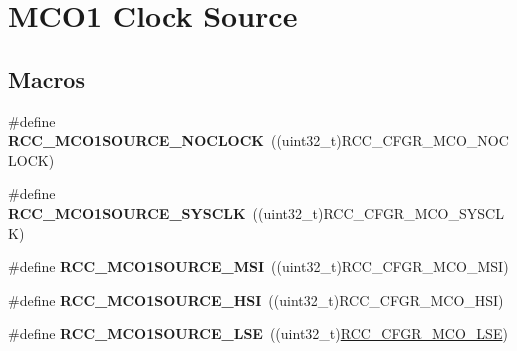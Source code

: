 \hypertarget{group___r_c_c___m_c_o1___clock___source}{\section{M\-C\-O1 Clock Source}
\label{group___r_c_c___m_c_o1___clock___source}
}
\subsection*{Macros}
\begin{DoxyCompactItemize}
\item 
\hypertarget{group___r_c_c___m_c_o1___clock___source_ga725a16362f3324ef5866dc5a1ff07cf5}{\#define {\bfseries R\-C\-C\-\_\-\-M\-C\-O1\-S\-O\-U\-R\-C\-E\-\_\-\-N\-O\-C\-L\-O\-C\-K}~((uint32\-\_\-t)R\-C\-C\-\_\-\-C\-F\-G\-R\-\_\-\-M\-C\-O\-\_\-\-N\-O\-C\-L\-O\-C\-K)}\label{group___r_c_c___m_c_o1___clock___source_ga725a16362f3324ef5866dc5a1ff07cf5}

\item 
\hypertarget{group___r_c_c___m_c_o1___clock___source_gae8ca2959a1252ecd319843da02c79526}{\#define {\bfseries R\-C\-C\-\_\-\-M\-C\-O1\-S\-O\-U\-R\-C\-E\-\_\-\-S\-Y\-S\-C\-L\-K}~((uint32\-\_\-t)R\-C\-C\-\_\-\-C\-F\-G\-R\-\_\-\-M\-C\-O\-\_\-\-S\-Y\-S\-C\-L\-K)}\label{group___r_c_c___m_c_o1___clock___source_gae8ca2959a1252ecd319843da02c79526}

\item 
\hypertarget{group___r_c_c___m_c_o1___clock___source_gac5ae615cfe916da9ecb212cf8ac102a6}{\#define {\bfseries R\-C\-C\-\_\-\-M\-C\-O1\-S\-O\-U\-R\-C\-E\-\_\-\-M\-S\-I}~((uint32\-\_\-t)R\-C\-C\-\_\-\-C\-F\-G\-R\-\_\-\-M\-C\-O\-\_\-\-M\-S\-I)}\label{group___r_c_c___m_c_o1___clock___source_gac5ae615cfe916da9ecb212cf8ac102a6}

\item 
\hypertarget{group___r_c_c___m_c_o1___clock___source_gad99c388c455852143220397db3730635}{\#define {\bfseries R\-C\-C\-\_\-\-M\-C\-O1\-S\-O\-U\-R\-C\-E\-\_\-\-H\-S\-I}~((uint32\-\_\-t)R\-C\-C\-\_\-\-C\-F\-G\-R\-\_\-\-M\-C\-O\-\_\-\-H\-S\-I)}\label{group___r_c_c___m_c_o1___clock___source_gad99c388c455852143220397db3730635}

\item 
\hypertarget{group___r_c_c___m_c_o1___clock___source_gaa01b6cb196df3a4ad690f8bcaa4d0621}{\#define {\bfseries R\-C\-C\-\_\-\-M\-C\-O1\-S\-O\-U\-R\-C\-E\-\_\-\-L\-S\-E}~((uint32\-\_\-t)\hyperlink{group___peripheral___registers___bits___definition_gad10ee688b7cf27e652ffd003f177fdcd}{R\-C\-C\-\_\-\-C\-F\-G\-R\-\_\-\-M\-C\-O\-\_\-\-L\-S\-E})}\label{group___r_c_c___m_c_o1___clock___source_gaa01b6cb196df3a4ad690f8bcaa4d0621}


\end{DoxyCompactItemize}
